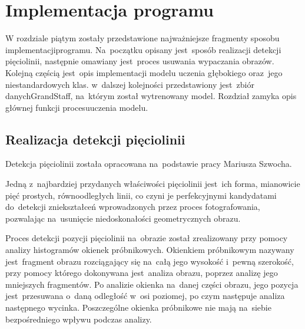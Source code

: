 \chapter{Implementacja programu}
W rozdziale piątym zostały przedstawione najważniejsze fragmenty sposobu implementacji\linebreak programu. Na~początku opisany jest~sposób realizacji detekcji pięciolinii, następnie omawiany jest~proces usuwania wypaczania obrazów. Kolejną częścią jest~opis implementacji modelu uczenia głębokiego oraz~jego niestandardowych klas. w~dalszej kolejności przedstawiony jest~zbiór danych\linebreak GrandStaff, na~którym został wytrenowany model. Rozdział zamyka opis głównej funkcji procesu\linebreak uczenia modelu.

\section{Realizacja detekcji pięciolinii}

Detekcja pięciolinii została opracowana na~podstawie pracy Mariusza Szwocha\cite{Szwoch2005}.

Jedną z~najbardziej przydanych właściwości pięciolinii jest~ich forma, mianowicie pięć prostych, równoodległych linii, co czyni je perfekcyjnymi kandydatami do~detekcji zniekształceń wprowadzonych przez proces fotografowania, pozwalając na~usunięcie niedoskonałości geometrycznych obrazu.

Proces detekcji pozycji pięciolinii na~obrazie został zrealizowany przy pomocy analizy histogramów okienek próbnikowych. Okienkiem próbnikowym nazywany jest~fragment obrazu rozciągający się na~całą jego wysokość i~pewną szerokość, przy pomocy którego dokonywana jest~analiza obrazu, poprzez analizę jego mniejszych fragmentów. Po analizie okienka na~danej części obrazu, jego pozycja jest~przesuwana o~daną odległość w~osi poziomej, po czym następuje analiza następnego wycinka. Poszczególne okienka próbnikowe nie mają na~siebie bezpośredniego wpływu podczas analizy.

